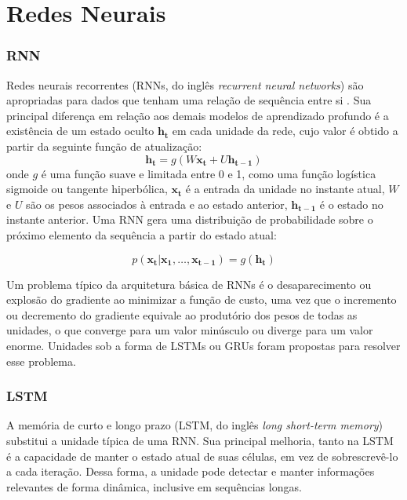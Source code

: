 \section{Redes Neurais}

\subsubsection{RNN}
Redes neurais recorrentes (RNNs, do inglês \textit{recurrent neural networks})
 são apropriadas para dados que tenham uma relação de sequência entre si
 \cite{gru4rec_1}. Sua principal diferença em relação aos demais modelos de
 aprendizado profundo é a existência de um estado oculto $\mathbf{h_t}$ em
 cada unidade da rede, cujo valor é obtido a partir da seguinte função de
 atualização:
\begin{equation}
    \mathbf{h_t} = g(W\mathbf{x_t} + U\mathbf{h_{t-1}})
\end{equation}
onde $g$ é uma função suave e limitada entre 0 e 1, como uma função logística
sigmoide ou tangente hiperbólica, $\mathbf{x_t}$ é a entrada da unidade no
instante atual, $W$ e $U$ são os pesos associados à entrada e ao estado
anterior, $\mathbf{h_{t-1}}$ é o estado no instante anterior. Uma RNN gera uma
distribuição de probabilidade sobre o próximo elemento da sequência a partir do
estado atual:

\begin{equation}
    p(\mathbf{x_t}|\mathbf{x_1},\ldots , \mathbf{x_{t-1}}) = g(\mathbf{h_t})
\end{equation}

Um problema típico da arquitetura básica de RNNs é o desaparecimento ou explosão
do gradiente ao minimizar a função de custo, uma vez que o incremento ou
decremento do gradiente equivale ao produtório dos pesos de todas as unidades, o
que converge para um valor minúsculo ou diverge para um valor enorme. Unidades
sob a forma de LSTMs ou GRUs foram propostas para resolver esse problema.


\subsubsection{LSTM}
A memória de curto e longo prazo (LSTM, do inglês \textit{long short-term
memory}) \cite{chung2014empirical} substitui a unidade típica de uma RNN. Sua
principal melhoria, tanto na LSTM é a capacidade de manter o estado atual
de suas células, em vez de sobrescrevê-lo a cada iteração. Dessa forma, a
unidade pode detectar e manter informações relevantes de forma dinâmica,
inclusive em sequências longas.

